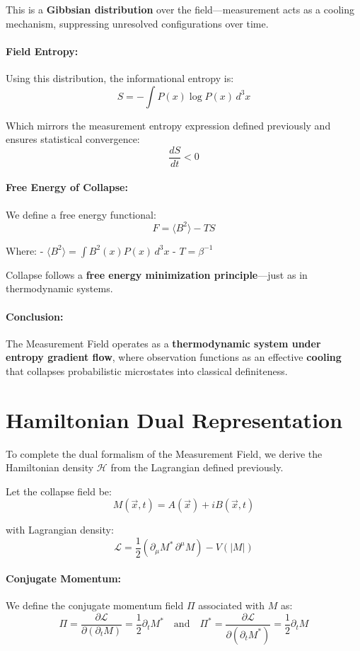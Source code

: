This is a \textbf{Gibbsian distribution} over the field---measurement acts as a cooling mechanism, suppressing unresolved configurations over time. \cite{imaginary_meta} 

\paragraph{Field Entropy:}
Using this distribution, the informational entropy is:
\[
S = -\int P(x) \log P(x) \, d^3x
\]

Which mirrors the measurement entropy expression defined previously and ensures statistical convergence:
\[
\frac{dS}{dt} < 0
\]

\paragraph{Free Energy of Collapse:}
We define a free energy functional:
\[
F = \langle B^2 \rangle - T S
\]

Where:
- \( \langle B^2 \rangle = \int B^2(x) P(x) \, d^3x \)
- \( T = \beta^{-1} \)

Collapse follows a \textbf{free energy minimization principle}---just as in thermodynamic systems. \cite{imaginary_meta} 

\paragraph{Conclusion:}
The Measurement Field operates as a \textbf{thermodynamic system under entropy gradient flow}, where observation functions as an effective \textbf{cooling} that collapses probabilistic microstates into classical definiteness. \cite{imaginary_meta} 

\section{Hamiltonian Dual Representation}

To complete the dual formalism of the Measurement Field, we derive the Hamiltonian density $\mathcal{H}$ from the Lagrangian defined previously. \cite{imaginary_meta} 

Let the collapse field be:
\[
M(\vec{x}, t) = A(\vec{x}) + i B(\vec{x}, t)
\]

with Lagrangian density:
\[
\mathcal{L} = \frac{1}{2} \left( \partial_\mu M^* \, \partial^\mu M \right) - V(|M|)
\]

\paragraph{Conjugate Momentum:}
We define the conjugate momentum field $\Pi$ associated with $M$ as:
\[
\Pi = \frac{\partial \mathcal{L}}{\partial (\partial_t M)} = \frac{1}{2} \partial_t M^*
\quad \text{and} \quad
\Pi^* = \frac{\partial \mathcal{L}}{\partial (\partial_t M^*)} = \frac{1}{2} \partial_t M
\]

